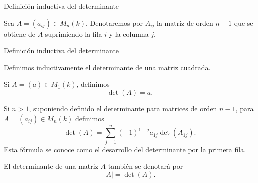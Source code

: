 \begin{frame}{Definición inductiva del determinante}

Sea \(A=(a_{ij})\in M_n(k)\). Denotaremos por \(A_{ij}\) la matriz
de orden \(n-1\) que se obtiene de \(A\) suprimiendo la fila \(i\)
y la columna \(j\).

\medskip

\begin{center}
\end{center}
\end{frame}

\begin{frame}{Definición inductiva del determinante}

\begin{definition}
Definimos inductivamente el \alert{determinante} de una matriz
cuadrada.

Si \(A=(a)\in M_1(k)\), definimos
\[
\det(A)=a.
\]

Si \(n>1\), suponiendo definido el determinante para matrices de
orden \(n-1\), para \(A=(a_{ij})\in M_n(k)\) definimos
\[
\det(A)
=
\sum_{j=1}^n(-1)^{1+j}a_{1j}\det(A_{1j}).
\]
Esta fórmula se conoce como el \alert{desarrollo del determinante por la primera fila}.

El determinante de una matriz $A$ también se denotará por 
\[|A|=\det(A).\]
\end{definition}

\end{frame}

